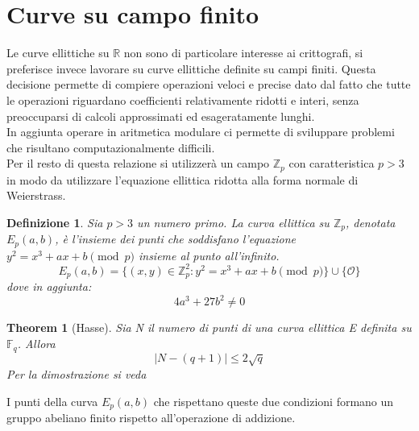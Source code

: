 \documentclass[12pt, a4paper]{report}
\newtheorem{definition}{Definizione}[section]
\newtheorem{theorem}{Theorem}[section]
\begin{document}
\section{Curve su campo finito}
Le curve ellittiche su $\mathbb{R}$ non sono di particolare interesse ai crittografi, si preferisce invece lavorare su curve ellittiche definite su campi finiti.
Questa decisione permette di compiere operazioni veloci e precise dato dal fatto che tutte le operazioni riguardano coefficienti relativamente ridotti e interi, senza preoccuparsi di calcoli approssimati ed esageratamente lunghi.
\\In aggiunta operare in aritmetica modulare ci permette di sviluppare problemi che risultano computazionalmente difficili.
\\Per il resto di questa relazione si utilizzerà un campo $\mathbb{Z}_p$ con caratteristica $p > 3$ in modo da utilizzare l'equazione ellittica ridotta alla forma normale di Weierstrass.
\begin{definition}
    Sia $p > 3$ un numero primo. La curva ellittica su $\mathbb{Z}_p$, denotata $E_p(a,b)$, è l'insieme dei punti che soddisfano l'equazione $y^2 = x^3 + ax + b \pmod p$ insieme al punto all'infinito.
    \begin{equation}
        E_p(a, b) = \{(x, y) \in \mathbb{Z}_p^2: y^2 = x^3 + ax + b \pmod{p} \} \cup \{\mathcal{O}\}
    \end{equation}
    dove in aggiunta:
    \begin{equation}
        4a^3 + 27b^2 \neq 0
    \end{equation}
\end{definition}
\begin{theorem}[Hasse]
    Sia N il numero di punti di una curva ellittica E definita su $\mathbb{F}_q$. Allora
    \begin{equation}
        | N - (q + 1) | \leq 2 \sqrt{q}
    \end{equation}
    Per la dimostrazione si veda \cite{silverman}
\end{theorem}
I punti della curva $E_p(a, b)$ che rispettano queste due condizioni formano un gruppo abeliano finito rispetto all'operazione di addizione. \cite{silverman}
\end{document}
